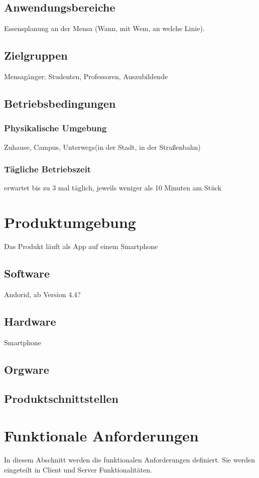 \documentclass[a4paper]{scrreprt}
\begin{document}
 
\section{Anwendungsbereiche}
Essensplanung an der Mensa (Wann, mit Wem, an welche Linie).
 
\section{Zielgruppen}
Mensagänger; Studenten, Professoren, Auszubildende 
 
\section{Betriebsbedingungen}
\subsection{Physikalische Umgebung}
Zuhause, Campus, Unterwegs(in der Stadt, in der Straßenbahn)

\subsection{Tägliche Betriebszeit}
erwartet bis zu 3 mal täglich, jeweils weniger als 10 Minuten am Stück 
 
\chapter{Produktumgebung}
Das Produkt läuft als App auf einem Smartphone

\section{Software}
Andorid, ab Version 4.4?
 
\section{Hardware}
Smartphone 
 
\section{Orgware}

\section{Produktschnittstellen} 
 
\chapter{Funktionale Anforderungen}
In diesem Abschnitt werden die funktionalen Anforderungen definiert. Sie werden eingeteilt in Client und Server Funktionalitäten.
\end{document}

